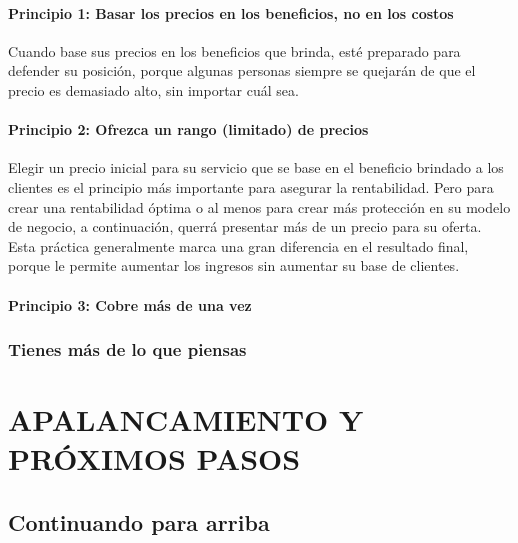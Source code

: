 \documentclass[10pt]{book}
\begin{document}
		\subsection{Principio 1: Basar los precios en los beneficios, no en los costos}
		    Cuando base sus precios en los beneficios que brinda, esté preparado para defender su posición, porque algunas personas siempre se quejarán de que el precio es demasiado alto, sin importar cuál sea. 

		\subsection{Principio 2: Ofrezca un rango (limitado) de precios}
		    Elegir un precio inicial para su servicio que se base en el beneficio brindado a los clientes es el principio más importante para asegurar la rentabilidad. Pero para crear una rentabilidad óptima o al menos para crear más protección en su modelo de negocio, a continuación, querrá presentar más de un precio para su oferta. Esta práctica generalmente marca una gran diferencia en el resultado final, porque le permite aumentar los ingresos sin aumentar su base de clientes.
		
		\subsection{Principio 3: Cobre más de una vez}

	    \section{Tienes más de lo que piensas}

\part{APALANCAMIENTO Y PRÓXIMOS PASOS}

    \chapter{Continuando para arriba}
\end{document}
